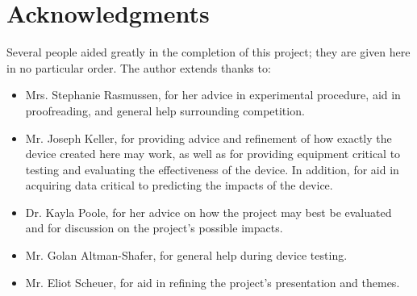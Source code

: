 \documentclass[fleqn,10pt]{SelfArx} %
\begin{document}
	\section*{Acknowledgments} %
	Several people aided greatly in the completion of this project; they are given here in no particular order. The author extends thanks to:
	\begin{itemize}
		\item Mrs. Stephanie Rasmussen, for her advice in experimental procedure, aid in proofreading, and general help surrounding competition.
		\item Mr. Joseph Keller, for providing advice and refinement of how exactly the device created here may work, as well as for providing equipment critical to testing and evaluating the effectiveness of the device. In addition, for aid in acquiring data critical to predicting the impacts of the device.
		\item Dr. Kayla Poole, for her advice on how the project may best be evaluated and for discussion on the project's possible impacts.
		\item Mr. Golan Altman-Shafer, for general help during device testing.
		\item Mr. Eliot Scheuer, for aid in refining the project's presentation and themes.
	\end{itemize}
	
	
	
	
	\nocite{*}
	
	
	
\end{document}
